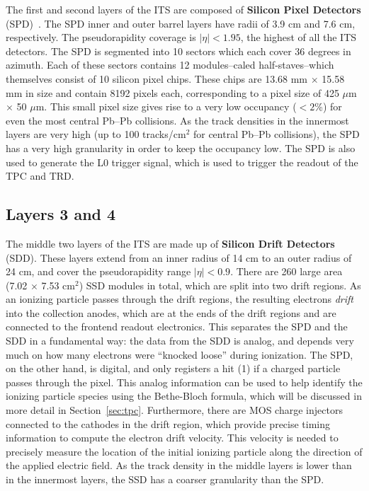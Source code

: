 The first and second layers of the ITS are composed of \textbf{Silicon Pixel Detectors} (SPD)~\cite{ITSSPD}. The SPD inner and outer barrel layers have radii of 3.9 cm and 7.6 cm, respectively. The pseudorapidity coverage is $|\eta| < 1.95$, the highest of all the ITS detectors. The SPD is segmented into 10 sectors which each cover 36 degrees in azimuth. Each of these sectors contains 12 modules--caled half-staves--which themselves consist of 10 silicon pixel chips. These chips are 13.68 mm $\times$ 15.58 mm in size and contain 8192 pixels each, corresponding to a pixel size of 425 $\mu$m $\times$ 50 $\mu$m. This small pixel size gives rise to a very low occupancy ($<2$\%) for even the most central Pb--Pb collisions.  As the track densities in the innermost layers are very high (up to 100 tracks/cm$^2$ for central Pb--Pb collisions), the SPD has a very high granularity in order to keep the occupancy low. The SPD is also used to generate the L0 trigger signal, which is used to trigger the readout of the TPC and TRD.

\subsection{Layers 3 and 4}
The middle two layers of the ITS are made up of \textbf{Silicon Drift Detectors} (SDD)\cite{ITSSDD}. These layers extend from an inner radius of 14 cm to an outer radius of 24 cm, and cover the pseudorapidity range $|\eta| < 0.9$. There are 260 large area (7.02 $\times$ 7.53 cm$^2$) SSD modules in total, which are split into two drift regions. As an ionizing particle passes through the drift regions, the resulting electrons \textit{drift} into the collection anodes, which are at the ends of the drift regions and are connected to the frontend readout electronics. This separates the SPD and the SDD in a fundamental way: the data from the SDD is analog, and depends very much on how many electrons were ``knocked loose'' during ionization. The SPD, on the other hand, is digital, and only registers a hit (1) if a charged particle passes through the pixel. This analog information can be used to help identify the ionizing particle species using the Bethe-Bloch formula, which will be discussed in more detail in Section~\ref{sec:tpc}. Furthermore, there are MOS charge injectors~\cite{MOSCharge} connected to the cathodes in the drift region, which provide precise timing information to compute the electron drift velocity. This velocity is needed to precisely measure the location of the initial ionizing particle along the direction of the applied electric field. As the track density in the middle layers is lower than in the innermost layers, the SSD has a coarser granularity than the SPD.

